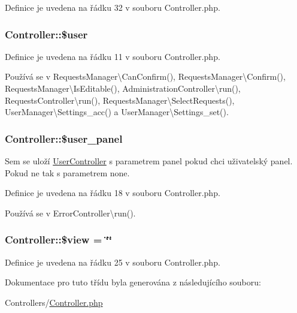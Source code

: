 Definice je uvedena na řádku 32 v souboru Controller.\-php.

\hypertarget{class_controller_a27b4bba4d04b0ddc7a71e8e8e61a2a0c}{
\subsubsection[{\$user}]{\setlength{\rightskip}{0pt plus 5cm}Controller\-::\$user\hspace{0.3cm}{\ttfamily [static]}}}\label{class_controller_a27b4bba4d04b0ddc7a71e8e8e61a2a0c}


Definice je uvedena na řádku 11 v souboru Controller.\-php.



Používá se v Requests\-Manager\textbackslash{}\-Can\-Confirm(), Requests\-Manager\textbackslash{}\-Confirm(), Requests\-Manager\textbackslash{}\-Is\-Editable(), Administration\-Controller\textbackslash{}run(), Requests\-Controller\textbackslash{}run(), Requests\-Manager\textbackslash{}\-Select\-Requests(), User\-Manager\textbackslash{}\-Settings\-\_\-acc() a User\-Manager\textbackslash{}\-Settings\-\_\-set().

\hypertarget{class_controller_a32cd7b776cbce922386fca162f061960}{
\subsubsection[{\$user\-\_\-panel}]{ Controller\-::\$user\-\_\-panel\hspace{0.3cm}{\ttfamily [protected]}}}\label{class_controller_a32cd7b776cbce922386fca162f061960}
Sem se uloží \hyperlink{class_user_controller}{User\-Controller} s parametrem panel pokud chci uživatelský panel. Pokud ne tak s parametrem none. 

Definice je uvedena na řádku 18 v souboru Controller.\-php.



Používá se v Error\-Controller\textbackslash{}run().

\hypertarget{class_controller_aeb713d8b3c9bf61c72c4fcabd0e1e48a}{
\subsubsection[{\$view}]{\setlength{\rightskip}{0pt plus 5cm}Controller\-::\$view = \char`\"{}\char`\"{}\hspace{0.3cm}{\ttfamily [protected]}}}\label{class_controller_aeb713d8b3c9bf61c72c4fcabd0e1e48a}


Definice je uvedena na řádku 25 v souboru Controller.\-php.



Dokumentace pro tuto třídu byla generována z následujícího souboru\-:\begin{DoxyCompactItemize}
\item 
Controllers/\hyperlink{_controller_8php}{Controller.\-php}\end{DoxyCompactItemize}
